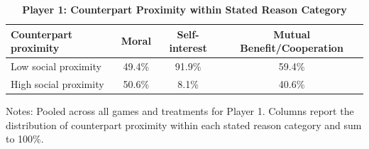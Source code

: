 \begin{table}[!htbp]
\centering
\caption{\textbf{Player 1: Counterpart Proximity within Stated Reason Category}}
\label{tab:player1_sp_by_category}
\begin{tabular}{lccc}
\toprule
Counterpart proximity & Moral & Self-interest & Mutual Benefit/Cooperation \\
\midrule
Low social proximity & 49.4\% & 91.9\% & 59.4\% \\
High social proximity & 50.6\% & 8.1\% & 40.6\% \\
\bottomrule
\end{tabular}
\begin{flushleft}
\footnotesize Notes: Pooled across all games and treatments for Player 1. Columns report the distribution of counterpart proximity within each stated reason category and sum to 100\%.
\end{flushleft}
\end{table}
